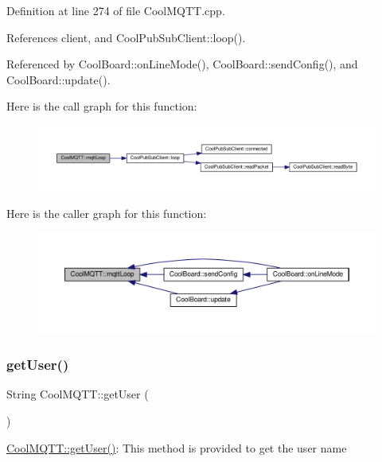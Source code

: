 Definition at line 274 of file Cool\+M\+Q\+T\+T.\+cpp.



References client, and Cool\+Pub\+Sub\+Client\+::loop().



Referenced by Cool\+Board\+::on\+Line\+Mode(), Cool\+Board\+::send\+Config(), and Cool\+Board\+::update().

Here is the call graph for this function\+:\nopagebreak
\begin{figure}[H]
\begin{center}
\leavevmode
\includegraphics[width=350pt]{d0/dd0/class_cool_m_q_t_t_aa5eaae967b562b62cbcf2b8d81f6e5d5_cgraph}
\end{center}
\end{figure}
Here is the caller graph for this function\+:\nopagebreak
\begin{figure}[H]
\begin{center}
\leavevmode
\includegraphics[width=350pt]{d0/dd0/class_cool_m_q_t_t_aa5eaae967b562b62cbcf2b8d81f6e5d5_icgraph}
\end{center}
\end{figure}
\mbox{\label{class_cool_m_q_t_t_a373cc92fca7760d886f02d8a6e5b3f63}} 
\subsubsection{\texorpdfstring{get\+User()}{getUser()}}
{\footnotesize\ttfamily String Cool\+M\+Q\+T\+T\+::get\+User (\begin{DoxyParamCaption}{ }\end{DoxyParamCaption})}

\hyperlink{class_cool_m_q_t_t_a373cc92fca7760d886f02d8a6e5b3f63}{Cool\+M\+Q\+T\+T\+::get\+User()}\+: This method is provided to get the user name 

